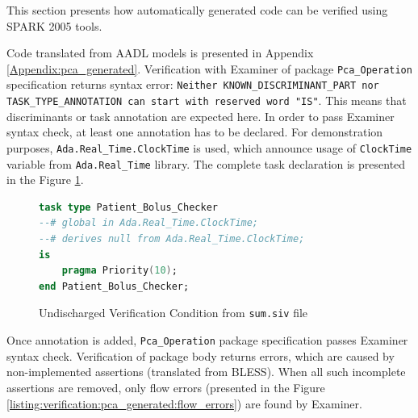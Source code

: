 This section presents how automatically generated code can be verified using SPARK 2005 tools.

Code translated from AADL models is presented in Appendix \ref{Appendix:pca_generated}. Verification with Examiner of package \lstinline{Pca_Operation} specification returns syntax error: \lstinline{Neither KNOWN_DISCRIMINANT_PART nor TASK_TYPE_ANNOTATION can start with reserved word "IS"}. This means that discriminants or task annotation are expected here. In order to pass Examiner syntax check, at least one annotation has to be declared. For demonstration purposes, \lstinline{Ada.Real_Time.ClockTime} is used, which announce usage of \lstinline{ClockTime} variable from \lstinline{Ada.Real_Time} library. The complete task declaration is presented in the Figure \ref{listing:verification:pca_generated:patient_bolus_checker}.

\begin{figure}
\singlespacing
\begin{lstlisting}[language=ada, frame=single, gobble=0]
task type Patient_Bolus_Checker
--# global in Ada.Real_Time.ClockTime;
--# derives null from Ada.Real_Time.ClockTime;
is
    pragma Priority(10);
end Patient_Bolus_Checker;
\end{lstlisting}
\doublespacing
\caption{Undischarged Verification Condition from \lstinline{sum.siv} file}
\label{listing:verification:pca_generated:patient_bolus_checker}
\end{figure}

Once annotation is added, \lstinline{Pca_Operation} package specification passes Examiner syntax check. Verification of package body returns errors, which are caused by non-implemented assertions (translated from BLESS). When all such incomplete assertions are removed, only flow errors (presented in the Figure \ref{listing:verification:pca_generated:flow_errors}) are found by Examiner. 

